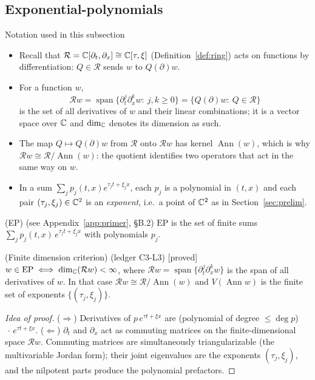 \documentclass[11pt,a4paper]{article}
\theoremstyle{definition}
\newcommand{\badge}[2]{\textcolor{#1}{\textsf{\footnotesize[#2]}}}
\newcommand{\proved}[1][]{\badge{cC}{proved#1}}
\newcommand{\led}[1]{\textcolor{cG}{\textsf{\footnotesize(ledger #1)}}}
\newcommand{\Ann}{\operatorname{Ann}}
\newcommand{\EP}{\mathrm{EP}}
\newcommand{\ring}{\mathcal{R}}
\newcommand{\Var}{V}
\DeclareMathOperator{\spn}{span}
\DeclareMathOperator{\dimc}{dim}
\begin{document}
\subsection{Exponential-polynomials}
\begin{notebox}{Notation used in this subsection}
\begin{itemize}[nosep]
\item Recall that $\ring=\C[\partial_t,\partial_x]\cong\C[\tau,\xi]$ (Definition~\ref{def:ring}) acts on functions by differentiation: $Q\in\ring$ sends $w$ to $Q(\partial)w$.
\item For a function $w$,
\[
\ring w=\spn\{\partial_t^j\partial_x^kw:\ j,k\ge0\}=\{Q(\partial)w:\ Q\in\ring\}
\]
is the set of all derivatives of $w$ and their linear combinations; it is a vector space over $\mathbb{C}$ and $\dimc_\C$ denotes its dimension as such.
\item The map $Q\mapsto Q(\partial)w$ from $\ring$ onto $\ring w$ has kernel $\Ann(w)$, which is why $\ring w\cong\ring/\Ann(w)$: the quotient identifies two operators that act in the same way on $w$.
\item In a sum $\sum_jp_j(t,x)e^{\tau_jt+\xi_jx}$, each $p_j$ is a polynomial in $(t,x)$ and each pair $(\tau_j,\xi_j)\in\mathbb{C}^2$ is an \emph{exponent}, i.e.\ a point of $\mathbb{C}^2$ as in Section~\ref{sec:prelim}.
\end{itemize}
\end{notebox}
\begin{definition}{(EP) \textcolor{cG}{\textsf{\footnotesize(see Appendix~\ref{app:primer}, \S B.2)}}}\label{def:ep}
$\EP$ is the set of finite sums $\sum_jp_j(t,x)\,e^{\tau_jt+\xi_jx}$ with polynomials $p_j$.
\end{definition}
\begin{lemma}{(Finite dimension criterion) \led{C3-L3} \proved[]}\label{lem:ep}
$w\in\EP\iff\dimc_\C(\ring w)<\infty$, where $\ring w=\spn\{\partial_t^j\partial_x^kw\}$ is the span of all derivatives of $w$. In that case $\ring w\cong\ring/\Ann(w)$ and $\Var(\Ann w)$ is the finite set of exponents $\{(\tau_j,\xi_j)\}$.
\end{lemma}
\begin{proof}[Idea of proof]
($\Rightarrow$) Derivatives of $p\,e^{\tau t+\xi x}$ are (polynomial of degree $\le\deg p$)$\,\cdot\,e^{\tau t+\xi x}$.
($\Leftarrow$) $\partial_t$ and $\partial_x$ act as commuting matrices on the finite-dimensional space $\ring w$. Commuting matrices are simultaneously triangularizable (the multivariable Jordan form); their joint eigenvalues are the exponents $(\tau_j,\xi_j)$, and the nilpotent parts produce the polynomial prefactors.
\end{proof}
\end{document}
